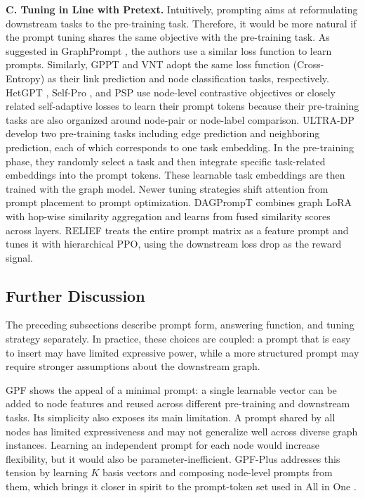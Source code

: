 \textbf{C. Tuning in Line with Pretext. }
Intuitively, prompting aims at reformulating downstream tasks to the pre-training task. Therefore, it would be more natural if the prompt tuning shares the same objective with the pre-training task. As suggested in GraphPrompt \cite{liu2023graphprompt}, the authors use a similar loss function to learn prompts. Similarly, GPPT \cite{sun2022gppt} and VNT \cite{tan2023virtual} adopt the same loss function (Cross-Entropy) as their link prediction and node classification tasks, respectively. HetGPT \cite{ma2023hetgpt}, Self-Pro \cite{gong2024selfpro}, and PSP \cite{ge2024psp} use node-level contrastive objectives or closely related self-adaptive losses to learn their prompt tokens because their pre-training tasks are also organized around node-pair or node-label comparison. ULTRA-DP \cite{chen2023ultradp} develop two pre-training tasks including edge prediction and neighboring prediction, each of which corresponds to one task embedding. In the pre-training phase, they randomly select a task and then integrate specific task-related embeddings into the prompt tokens. These learnable task embeddings are then trained with the graph model. Newer tuning strategies shift attention from prompt placement to prompt optimization. DAGPrompT \cite{chen2025dagprompt} combines graph LoRA with hop-wise similarity aggregation and learns from fused similarity scores across layers. RELIEF \cite{zhu2024relief} treats the entire prompt matrix as a feature prompt and tunes it with hierarchical PPO, using the downstream loss drop as the reward signal.



\subsection{Further Discussion}\label{subsec:pdiscussion}

\textit{}

The preceding subsections describe prompt form, answering function, and tuning strategy separately. In practice, these choices are coupled: a prompt that is easy to insert may have limited expressive power, while a more structured prompt may require stronger assumptions about the downstream graph.

GPF \cite{fang2022prompt} shows the appeal of a minimal prompt: a single learnable vector can be added to node features and reused across different pre-training and downstream tasks. Its simplicity also exposes its main limitation. A prompt shared by all nodes has limited expressiveness and may not generalize well across diverse graph instances. Learning an independent prompt for each node would increase flexibility, but it would also be parameter-inefficient. GPF-Plus \cite{fang2023universal} addresses this tension by learning $K$ basis vectors and composing node-level prompts from them, which brings it closer in spirit to the prompt-token set used in All in One \cite{sun2023all}.



